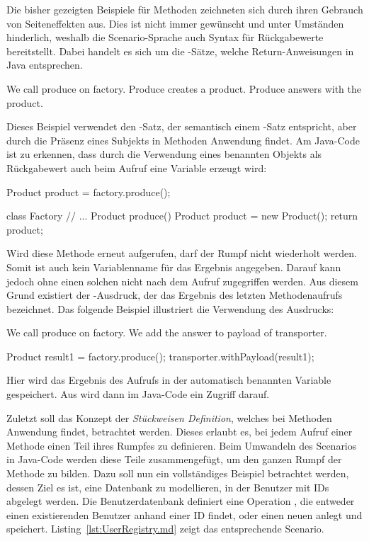 Die bisher gezeigten Beispiele für Methoden zeichneten sich durch ihren Gebrauch von Seiteneffekten aus.
Dies ist nicht immer gewünscht und unter Umständen hinderlich, weshalb die Scenario-Sprache auch Syntax für Rückgabewerte bereitstellt.
Dabei handelt es sich um die -Sätze, welche Return-Anweisungen in Java entsprechen.

\begin{codeblock}
    We call produce on factory.
    Produce creates a product.
    Produce answers with the product.
\end{codeblock}

Dieses Beispiel verwendet den -Satz, der semantisch einem -Satz entspricht, aber durch die Präsenz eines Subjekts in Methoden Anwendung findet.
Am Java-Code ist zu erkennen, dass durch die Verwendung eines benannten Objekts als Rückgabewert auch beim Aufruf eine Variable erzeugt wird:

\begin{jcodeblock}
    Product product = factory.produce();

    class Factory {
        // ...
        Product produce() {
            Product product = new Product();
            return product;
        }
    }
\end{jcodeblock}

Wird diese Methode erneut aufgerufen, darf der Rumpf nicht wiederholt werden.
Somit ist auch kein Variablenname für das Ergebnis angegeben.
Darauf kann jedoch ohne einen solchen nicht nach dem Aufruf zugegriffen werden.
Aus diesem Grund existiert der -Ausdruck, der das Ergebnis des letzten Methodenaufrufs bezeichnet.
Das folgende Beispiel illustriert die Verwendung des Ausdrucks:

\begin{codeblock}
    We call produce on factory.
    We add the answer to payload of transporter.
\end{codeblock}

\begin{jcodeblock}
    Product result1 = factory.produce();
    transporter.withPayload(result1);
\end{jcodeblock}

Hier wird das Ergebnis des Aufrufs in der automatisch benannten Variable  gespeichert.
Aus  wird dann im Java-Code ein Zugriff darauf.

Zuletzt soll das Konzept der \emph{Stückweisen Definition}, welches bei Methoden Anwendung findet, betrachtet werden.
Dieses erlaubt es, bei jedem Aufruf einer Methode einen Teil ihres Rumpfes zu definieren.
Beim Umwandeln des Scenarios in Java-Code werden diese Teile zusammengefügt, um den ganzen Rumpf der Methode zu bilden.
Dazu soll nun ein vollständiges Beispiel betrachtet werden, dessen Ziel es ist, eine Datenbank zu modellieren, in der Benutzer mit IDs abgelegt werden.
Die Benutzerdatenbank definiert eine Operation , die entweder einen existierenden Benutzer anhand einer ID findet, oder einen neuen anlegt und speichert.
Listing~\ref{lst:UserRegistry.md} zeigt das entsprechende Scenario.

